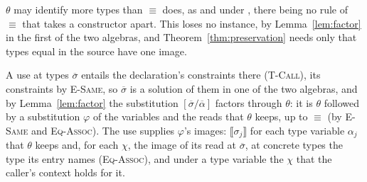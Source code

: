 $\theta$ may identify more types than $\equiv$ does, as  and  under , there being no rule of $\equiv$ that takes a constructor apart.
This loses no instance, by Lemma~\ref{lem:factor} in the first of the two algebras, and Theorem~\ref{thm:preservation} needs only that types equal in the source have one image.

A use at types $\overline{\sigma}$ entails the declaration's constraints there (\textsc{T-Call}), its  constraints by \textsc{E-Same}, so $\overline{\sigma}$ is a solution of them in one of the two algebras, and by Lemma~\ref{lem:factor} the substitution $[\overline{\sigma}/\overline{\alpha}]$ factors through $\theta$: it is $\theta$ followed by a substitution $\varphi$ of the variables and the reads that $\theta$ keeps, up to $\equiv$ (by \textsc{E-Same} and \textsc{Eq-Assoc}).
The use supplies $\varphi$'s images: $\llbracket \sigma_j \rrbracket$ for each type variable $\alpha_j$ that $\theta$ keeps and, for each $\chi$, the image of its read at $\overline{\sigma}$, at concrete types the type its entry names (\textsc{Eq-Assoc}), and under a type variable the $\chi$ that the caller's context holds for it.

